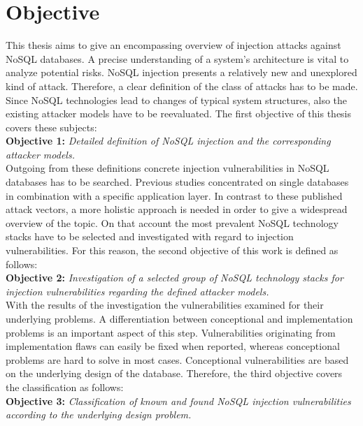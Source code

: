 \section{Objective}
\label{sec:objective}
This thesis aims to give an encompassing overview of injection attacks against NoSQL databases. A precise understanding of a system's architecture is vital to analyze potential risks. NoSQL injection presents a relatively new and unexplored kind of attack. Therefore, a clear definition of the class of attacks has to be made. Since NoSQL technologies lead to changes of typical system structures, also the existing attacker models have to be reevaluated. The first objective of this thesis covers these subjects: \\

\textbf{Objective 1:} \textit{Detailed definition of NoSQL injection and the corresponding attacker models.} \\

Outgoing from these definitions concrete injection vulnerabilities in NoSQL databases has to be searched. Previous studies concentrated on single databases in combination with a specific application layer. In contrast to these published attack vectors, a more holistic approach is needed in order to give a widespread overview of the topic. On that account the most prevalent NoSQL technology stacks have to be selected and investigated with regard to injection vulnerabilities. For this reason, the second objective of this work is defined as follows: \\

\textbf{Objective 2:} \textit{Investigation of a selected group of NoSQL technology stacks for injection vulnerabilities regarding the defined attacker models.} \\

With the results of the investigation the vulnerabilities examined for their underlying problems. A differentiation between conceptional and implementation problems is an important aspect of this step. Vulnerabilities originating from implementation flaws can easily be fixed when reported, whereas conceptional problems are hard to solve in most cases. Conceptional vulnerabilities are based on the underlying design of the database. Therefore, the third objective covers the classification as follows: \\

\textbf{Objective 3:} \textit{Classification of known and found NoSQL injection vulnerabilities according to the underlying design problem.} \\

